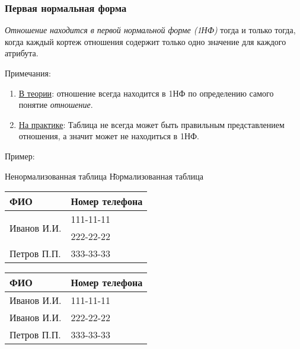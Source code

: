 \begin{frame}

\frametitle{Первая нормальная форма}

\emph{Отношение находится в первой нормальной форме (1НФ)} тогда и только тогда,
когда каждый кортеж отношения содержит только одно значение для
каждого атрибута.

\medskip

Примечания:
\begin{enumerate}
\item \underline{В теории}: отношение всегда находится в 1НФ по определению самого
понятие \emph{отношение}.
\item \underline{На практике}: Таблица не всегда может быть правильным представлением
отношения, а значит может не находиться в 1НФ.
\end{enumerate}

\medskip

Пример:

\begin{tabbing}
Ненормализованная таблица\hspace{1cm} \= Нормализованная таблица \\

\begin{tabular}{|l|l|}\hline
	ФИО & Номер телефона \\	\hline
	\multirow{2}{*}{Иванов И.И.} & 111-11-11 \\
	                             & 222-22-22 \\	\hline
	Петров П.П.                  & 333-33-33 \\	\hline	
\end{tabular}
\>
\begin{tabular}{|l|l|}\hline
	ФИО & Номер телефона \\ \hline
	Иванов И.И. & 111-11-11 \\ \hline
	Иванов И.И. & 222-22-22 \\ \hline
	Петров П.П. & 333-33-33 \\\hline	
\end{tabular}
\end{tabbing}

\end{frame}


